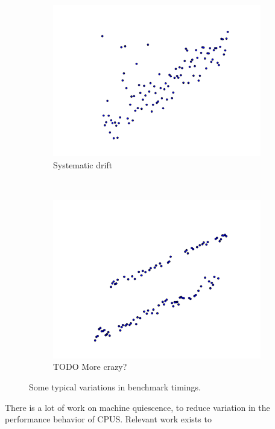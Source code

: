 \documentclass[conference]{IEEEtran}
\begin{document}
\begin{figure}
\begin{subfigure}{0.22\textwidth}
    \centering
    \includegraphics[width=\textwidth]{figures/fig1/drift_manyallocs_slow}
    \caption{Systematic drift}
\end{subfigure}
~
\begin{subfigure}{0.22\textwidth}
    \centering
    \includegraphics[width=\textwidth]{figures/fig1/bimodal_drift_sumindex}
    \caption{TODO More crazy?}
\end{subfigure}

\caption{Some typical variations in benchmark timings.}
\label{fig:examplebenchmarks}
\end{figure}

There is a lot of work on machine quiescence, to reduce variation in the performance
behavior of CPUS. Relevant work exists to
\end{document}
